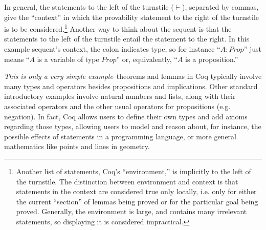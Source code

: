 \documentclass[11pt]{amsart}
\begin{document}
In general, the statements to the left of the turnstile ($\vdash$), separated by commas, give the ``context'' in which the provability statement to the right of the turnstile is to be considered.\footnote{Another list of statements, Coq's ``environment,'' is implicitly to the left of the turnstile.  The distinction between environment and context is that statements in the context are considered true only locally, i.e. only for either the current ``section'' of lemmas being proved or for the particular goal being proved.  Generally, the environment is large, and contains many irrelevant statements, so displaying it is considered impractical.}  Another way to think about the sequent is that the statements to the left of the turnstile entail the statement to the right.  In this example sequent's context, the colon indicates type, so for instance ``$A : Prop$'' just means ``$A$ is a variable of type $Prop$'' or, equivalently, ``$A$ is a proposition.''

\textit{This is only a very simple example}--theorems and lemmas in Coq typically involve many types and operators besides propositions and implications.  Other standard introductory examples involve natural numbers and lists, along with their associated operators and the other usual operators for propositions (e.g. negation).  In fact, Coq allows users to define their own types and add axioms regarding those types, allowing users to model and reason about, for instance, the possible effects of statements in a programming language, or more general mathematics like points and lines in geometry.
\end{document}

